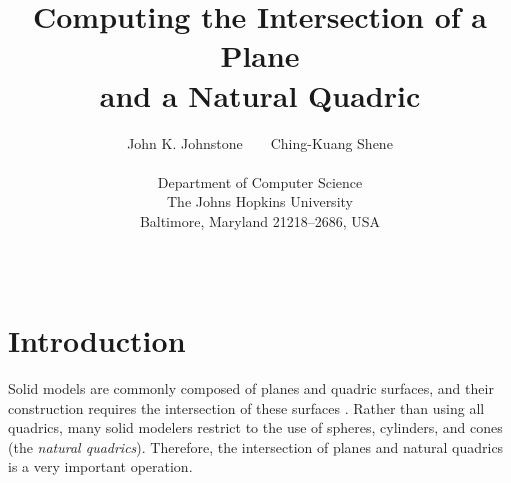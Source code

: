 
\newif\ifFull
\Fulltrue

\def\thefootnote{\fnsymbol{footnote}}

\title{
     Computing the Intersection of a Plane \\
     and a Natural Quadric\footnotemark[1]}

\author{John K. Johnstone\ \ \ \ Ching-Kuang Shene\\ \\
          Department of Computer Science\\
          The Johns Hopkins University \\
          Baltimore, Maryland 21218--2686, USA}

\date{\ }

\newtheorem{example}{Example}[section]
\newtheorem{property}{Property}[section]
\newtheorem{definition}{Definition}[section]
\newtheorem{theorem}{Theorem}[section]
\newtheorem{lemma}{Lemma}[section]
\newtheorem{corollary}{Corollary}[section]

\newcommand{\DoubleSpace}{\edef\baselinestretch{1.4}\Large\normalsize}
\newcommand{\QED}{\ \ \ \rule{2mm}{3mm}\\}
\newcommand{\arrow}[1]{\vec{\bf #1}}

\setlength{\oddsidemargin}{0pt}
\setlength{\evensidemargin}{0pt}
\setlength{\headsep}{0pt}
\setlength{\topmargin}{0pt}
\setlength{\textheight}{8.75in}
\setlength{\textwidth}{6.5in}



\maketitle
{}

\def\thefootnote{\arabic{footnote}}
\setcounter{footnote}{0}


\section{Introduction}

Solid models are commonly composed of planes and quadric surfaces,
and their construction requires the intersection of these surfaces
\cite{HOF89,MANT88}.
Rather than using all quadrics, 
many solid modelers restrict to the use of spheres, cylinders,
and cones (the {\em natural quadrics}).
Therefore, the intersection of planes and natural quadrics is a very important
operation.

